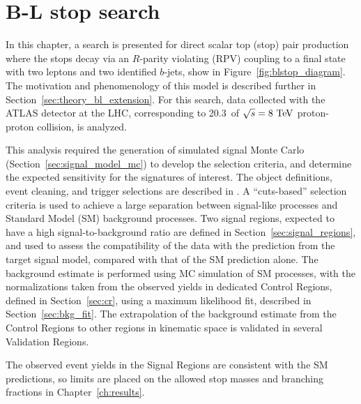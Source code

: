 \chapter[B-L stop search][B-L stop search]{B-L stop search}
\label{ch:bl_stop}

In this chapter, a search is presented for direct scalar top (stop) pair
production where the stops decay via an $R$-parity violating (RPV) coupling to
a final state with two leptons and two identified $b$-jets, show in
Figure~\ref{fig:blstop_diagram}.
The motivation and phenomenology of this model is described further in
Section~\ref{sec:theory_bl_extension}.
For this search, data collected with the ATLAS detector at the LHC,
corresponding to 20.3~\ifb of $\sqrt{s} = 8\TeV$ proton-proton collision, is
analyzed.

This analysis required the generation of simulated signal Monte Carlo 
(Section~\ref{sec:signal_model_mc}) to develop the selection criteria, and
determine the expected sensitivity for the signatures of interest.
The object definitions, event cleaning, and trigger selections are described in
.
A ``cuts-based'' selection criteria is used to achieve a large separation between
signal-like processes and Standard Model (SM) background processes.
Two signal regions, expected to have a high signal-to-background ratio are
defined in Section~\ref{sec:signal_regions}, and used to assess the
compatibility of the data with the prediction from the target signal model,
compared with that of the SM prediction alone.
The background estimate is performed using MC simulation of SM processes, with
the normalizations taken from the observed yields in dedicated Control Regions,
defined in Section~\ref{sec:cr}, using a maximum likelihood fit, described in
Section~\ref{sec:bkg_fit}.
The extrapolation of the background estimate from the Control Regions to other
regions in kinematic space is validated in several Validation Regions.

The observed event yields in the Signal Regions are consistent with the SM
predictions, so limits are placed on the allowed stop masses and branching
fractions in Chapter~\ref{ch:results}.


